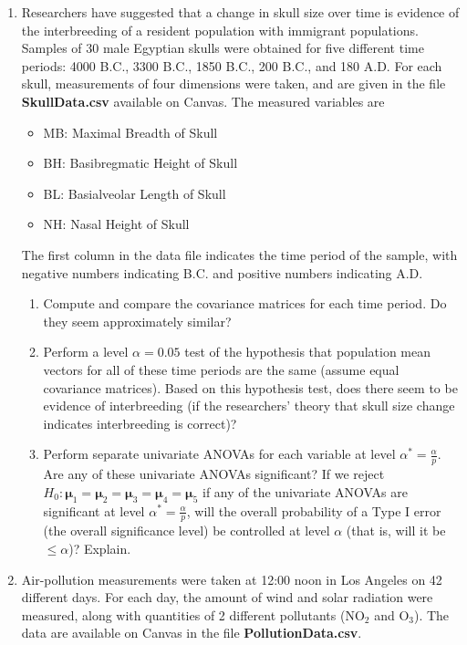 \documentclass{article}
\theoremstyle{plain}
\theoremstyle{definition}
\theoremstyle{remark}
\begin{document}
\begin{enumerate}
\item  Researchers have suggested that a change in skull size over time is evidence of the interbreeding of a resident population with immigrant populations.  Samples of 30 male Egyptian skulls were obtained for five different time periods: 4000 B.C., 3300 B.C., 1850 B.C., 200 B.C., and 180 A.D.  For each skull, measurements of four dimensions were taken, and are given in the file \textbf{SkullData.csv} available on Canvas.  The measured variables are
\begin{itemize}
\item  MB: Maximal Breadth of Skull
\item  BH: Basibregmatic Height of Skull
\item  BL: Basialveolar Length of Skull
\item NH: Nasal Height of Skull
\end{itemize}
The first column in the data file indicates the time period of the sample, with negative numbers indicating B.C. and positive numbers indicating A.D.
\begin{enumerate}
\item Compute and compare the covariance matrices for each time period.  Do they seem approximately similar?
\item Perform a level $\alpha = 0.05$ test of the hypothesis that population mean vectors for all of these time periods are the same (assume equal covariance matrices).  Based on this hypothesis test, does there seem to be evidence of interbreeding (if the researchers' theory that skull size change indicates interbreeding is correct)?
\item Perform separate univariate ANOVAs for each variable at level $\alpha^* = \frac{\alpha}{p}$.  Are any of these univariate ANOVAs significant?  If we reject $H_0:\bm{\mu}_1 = \bm{\mu}_2 = \bm{\mu}_3 = \bm{\mu}_4 = \bm{\mu}_5$ if any of the univariate ANOVAs are significant at level  $\alpha^* = \frac{\alpha}{p}$, will the overall probability of a Type I error (the overall significance level) be controlled at level $\alpha$ (that is, will it be $\leq \alpha$)? Explain.
\end{enumerate}

\item   Air-pollution measurements were taken at 12:00 noon in Los Angeles on 42 different days.  For each day, the  amount of wind and solar radiation were measured, along with quantities of 2 different pollutants (NO$_2$ and O$_3$).  The data are available on Canvas in the file \textbf{PollutionData.csv}.   


\end{enumerate}
\end{document}
